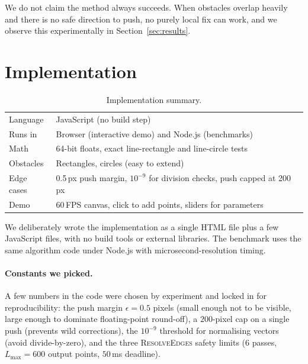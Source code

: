\documentclass[10pt,a4paper,twocolumn]{article}
\begin{document}
We do not claim the method always succeeds. When obstacles overlap
heavily and there is no safe direction to push, no purely local fix
can work, and we observe this experimentally in
Section~\ref{sec:results}.

\section{Implementation}

\begin{table}[h]\centering\small
\caption{Implementation summary.}\label{tab:impl}
\begin{tabular}{@{}p{}p{}@{}}
\toprule
Language & JavaScript (no build step) \\
Runs in  & Browser (interactive demo) and Node.js (benchmarks) \\
Math     & 64-bit floats, exact line-rectangle and line-circle tests \\
Obstacles& Rectangles, circles (easy to extend) \\
Edge cases & 0.5\,px push margin, $10^{-9}$ for division checks,
            push capped at 200\,px \\
Demo     & 60\,FPS canvas, click to add points, sliders for parameters \\
\bottomrule
\end{tabular}
\end{table}

We deliberately wrote the implementation as a single HTML file plus a
few JavaScript files, with no build tools or external libraries. The
benchmark uses the same algorithm code under Node.js with
microsecond-resolution timing.

\paragraph*{Constants we picked.}
A few numbers in the code were chosen by experiment and locked in for
reproducibility: the push margin $\epsilon = 0.5$ pixels (small enough
not to be visible, large enough to dominate floating-point round-off),
a $200$-pixel cap on a single push (prevents wild corrections), the
$10^{-9}$ threshold for normalising vectors (avoid divide-by-zero), and
the three \textsc{ResolveEdges} safety limits ($6$ passes,
$L_{\max}{=}600$ output points, $50$\,ms deadline).
\end{document}
